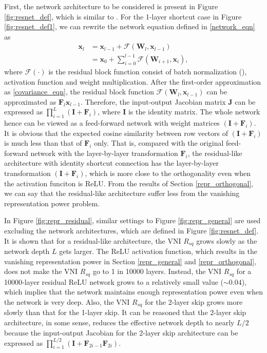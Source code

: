 First, the network architecture to be considered is present in Figure \ref{fig:resnet_def}, which is
similar to \cite{resnet2}. For the 1-layer shortcut case in Figure \ref{fig:resnet_def1}, we can
rewrite the network equation defined in \eqref{network_eqn} as
\begin{equation}
    \begin{aligned}
        \mathbf{x}_{l}&=\mathbf{x}_{l-1} + \mathcal{F}(\mathbf{W}_l, \mathbf{x}_{l-1})\\
        &=\mathbf{x}_{0} + \sum_{i=0}^{l-1}\mathcal{F}(\mathbf{W}_{i+1}, \mathbf{x}_{i}),
    \end{aligned}
\label{resnet_eqn}
\end{equation}
where $\mathcal{F}(\cdot)$ is the residual block function consist of batch normalization
(\cite{batchnorm}), activation function and weight multiplication.
After the first-order approximation as \eqref{covariance_eqn}, the residual block function
$\mathcal{F}(\mathbf{W}_l, \mathbf{x}_{l-1})$ can be approximated as $\mathbf{F}_l\mathbf{x}_{l-1}$.
Therefore, the input-output Jacobian matrix $\mathbf{J}$ can be expressed as
$\prod_{i=1}^{L}(\mathbf{I}+\mathbf{F}_i)$, where $\mathbf{I}$ is the identity matrix.
The whole network hence can be viewed as a feed-forward network with weight matrices
$(\mathbf{I}+\mathbf{F}_i)$. It is obvious that the expected cosine similarity between row vectors 
of $(\mathbf{I}+\mathbf{F}_i)$ is much less than that of $\mathbf{F}_i$ only.
That is, compared with the original feed-forward network with the layer-by-layer transformation
$\mathbf{F}_i$, the residual-like architecture with identity shortcut connection has the
layer-by-layer transformation $(\mathbf{I}+\mathbf{F}_i)$, which is more close to the orthogonality
even when the activation funciton is ReLU.
From the results of Section \ref{repr_orthogonal}, we can say that the residual-like architecture
suffer less from the vanishing representation power problem.

In Figure \ref{fig:repr_residual}, similar settings to Figure \ref{fig:repr_general} are 
used excluding the network architectures, which are defined in Figure \ref{fig:resnet_def}.
It is shown that for a residual-like architecture, the VNI $R_{sq}$ grows slowly as the network
depth $L$ gets larger. The ReLU activation function, which results in the vanishing representation
power in Section \ref{repr_general} and \ref{repr_orthogonal}, does not make the VNI $R_{sq}$ go
to 1 in 10000 layers. Instead, the VNI $R_{sq}$ for a 10000-layer residual ReLU network grows to a
relatively small value ($\sim0.04$), which implies that the network maintains enough representation
power even when the network is very deep.
Also, the VNI $R_{sq}$ for the 2-layer skip grows more slowly than that for the 1-layer skip. It 
can be reasoned that the 2-layer skip architecture, in some sense, reduces the effective network depth
to nearly $L/2$ because the input-output Jacobian for the 2-layer skip architecture can be
expressed as $\prod_{i=1}^{L/2}(\mathbf{I}+\mathbf{F}_{2i-1}\mathbf{F}_{2i})$.


